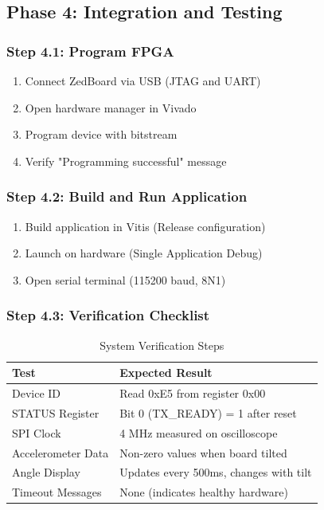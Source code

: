 \documentclass[11pt,a4paper]{article}
\begin{document}
\subsection{Phase 4: Integration and Testing}

\subsubsection{Step 4.1: Program FPGA}

\begin{enumerate}
    \item Connect ZedBoard via USB (JTAG and UART)
    \item Open hardware manager in Vivado
    \item Program device with bitstream
    \item Verify "Programming successful" message
\end{enumerate}

\subsubsection{Step 4.2: Build and Run Application}

\begin{enumerate}
    \item Build application in Vitis (Release configuration)
    \item Launch on hardware (Single Application Debug)
    \item Open serial terminal (115200 baud, 8N1)
\end{enumerate}

\subsubsection{Step 4.3: Verification Checklist}

\begin{table}[H]
\centering
\caption{System Verification Steps}
\begin{tabular}{@{}lp{8cm}@{}}
\toprule
\textbf{Test} & \textbf{Expected Result} \\ \midrule
Device ID & Read 0xE5 from register 0x00 \\
STATUS Register & Bit 0 (TX\_READY) = 1 after reset \\
SPI Clock & 4 MHz measured on oscilloscope \\
Accelerometer Data & Non-zero values when board tilted \\
Angle Display & Updates every 500ms, changes with tilt \\
Timeout Messages & None (indicates healthy hardware) \\ \bottomrule
\end{tabular}
\end{table}
\end{document}

